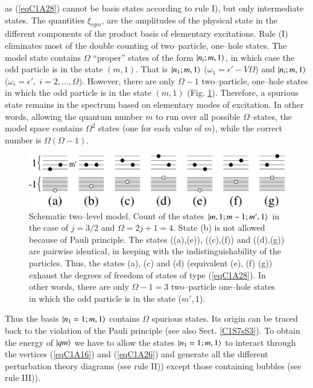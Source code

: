 as (\ref{eqC1A28}) cannot be basis states according to rule I), but only intermediate
states. The quantities $\xi_{iqm}$, are the amplitudes of the physical state in the different components of the product basis of elementary excitations. Rule (I) eliminates most of the double counting of two--particle, one--hole states. The model state contains $\Omega$ ``proper'' states of the form $|{n_i;m,1} \rangle$,  in which case the odd particle is in the state $(m,1)$. That is $|{n_1;m,1} \rangle$ ($\omega_1=\epsilon'-V\Omega$) and $|{n_i;m,1} \rangle$ ($\omega_i=\epsilon',\; i=2,\dots,\Omega$). However, there are only $\Omega-1$ two--particle, one--hole states in which the odd particle is in the state $(m,1)$ (Fig. \ref{figalpha}). Therefore, a spurious state remains in the spectrum based on elementary modes of excitation. In other words, allowing the quantum number $m$ to run over all possible $\Omega$--states, the  model space contains $\Omega^2$ states (one for each value of $m$), while the correct number is $\Omega(\Omega-1)$.


  \begin{figure}
  \centerline {
  \includegraphics*[width=13cm]{introduccion/figs/figalpha}
  }
  \caption{Schematic two--level model. Count of the states $|{m,1;m-1;m',1} \rangle$ in the case of $j=3/2$ and $\Omega=2j+1=4$. State (b) is not allowed because of Pauli principle. The states ((a),(e)), ((c),(f)) and ((d),(g)) are pairwise identical, in keeping with the indistinguishability of the particles. Thus, the states (a), (c) and (d) (equivalent (e), (f) (g)) exhaust the degrees of freedom of states of type (\ref{eqC1A28}). In other words, there are only $\Omega-1=3$ two--particle one--hole states in which the odd particle is in the state ($m',1$).}
  \label{figalpha}
  \end{figure}
Thus the basis $|{n_1=1; m,1} \rangle$ contains $\Omega$ spurious states. Its origin can be
traced back to the violation of the Pauli principle (see also Sect. \ref{C1S7sS3}).
To obtain the energy of $|{qm} \rangle$ we have to allow the states $|{n_1=1;m,1} \rangle$
to interact through the vertices (\ref{eqC1A16}) and (\ref{eqC1A26}) and generate all the different
perturbation theory diagrams (see rule II)) except those containing bubbles
(see rule III)).


